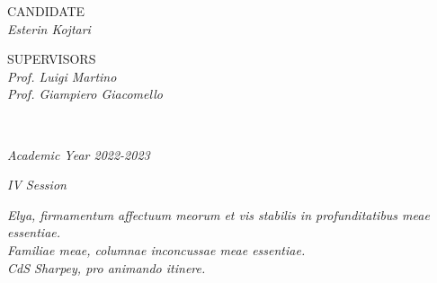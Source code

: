 \documentclass[12pt,a4paper]{report}
\begin{document}
\begin{titlepage}
\begin{center}
        
        
        
        \vspace{2.0cm}
\begin{minipage}[t]{0.34\textwidth}
  \begin{flushleft}
    {\fontsize{16pt}{16pt}CANDIDATE
    \vspace{0.5cm}
    \\ \textcolor{MyDarkBlue}{\textit{Esterin Kojtari}}}
  \end{flushleft}
\end{minipage}
\begin{minipage}[t]{0.64\textwidth}
  \begin{flushright}
    \Large
    SUPERVISORS \\
    \vspace{0.5cm}
    \textcolor{MyDarkBlue}{\textit{Prof. Luigi Martino}} \\
    \textcolor{MyDarkBlue}{\textit{Prof. Giampiero Giacomello}}\\  
  \end{flushright}
\end{minipage}\\

        
        \vfill
        \noindent\hrulefill
        \Large
        

        
        \textit{Academic Year 2022-2023}

        \textit{IV Session}
    \end{center}
\end{titlepage}
\restoregeometry

\clearpage %
\thispagestyle{empty} %
\begin{flushright}
{\parbox{4.2cm}{\textit{Elya, firmamentum affectuum meorum et vis stabilis in profunditatibus meae essentiae. \\[10pt] Familiae meae, columnae inconcussae meae essentiae. \\[10pt] CdS Sharpey, pro animando itinere.}}}
\end{flushright}

\clearpage %
\thispagestyle{empty} %


\end{document}
